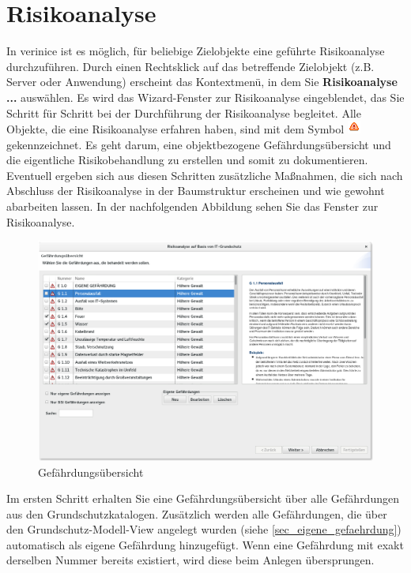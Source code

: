 \documentclass[a4paper,10pt]{book}
\begin{document}
\section{Risikoanalyse} \label{Risikoanalyse}
In verinice ist es möglich, für beliebige Zielobjekte eine geführte Risikoanalyse durchzuführen. Durch einen Rechtsklick auf das betreffende Zielobjekt (z.B. Server oder Anwendung) erscheint das Kontextmenü, in dem Sie \textbf{Risikoanalyse ...} auswählen. Es wird das Wizard-Fenster zur Risikoanalyse eingeblendet, das Sie Schritt für Schritt bei der Durchführung der Risikoanalyse begleitet. Alle Objekte, die eine Risikoanalyse erfahren haben, sind mit dem Symbol \includegraphics[height=2ex]{Icon/Risikoanalyse.png} gekennzeichnet. Es geht darum, eine objektbezogene Gefährdungsübersicht und die eigentliche Risikobehandlung zu erstellen und somit zu dokumentieren. Eventuell ergeben sich aus diesen Schritten zusätzliche Maßnahmen, die sich nach Abschluss der Risikoanalyse in der Baumstruktur erscheinen und wie gewohnt abarbeiten lassen. In der nachfolgenden Abbildung sehen Sie das Fenster zur Risikoanalyse.
\newline
\begin{figure}[H]
  \centering
  \includegraphics[width=\textwidth]{Screenshot/gefaehrdungsuebersicht.png}
  \caption{\label{Gefaehrdungsuebersicht} Gefährdungsübersicht}
\end{figure}
Im ersten Schritt erhalten Sie eine Gefährdungsübersicht über alle Gefährdungen aus den Grundschutzkatalogen. Zusätzlich werden alle Gefährdungen, die über den Grundschutz-Modell-View angelegt wurden (siehe \ref{sec_eigene_gefaehrdung}) automatisch als eigene Gefährdung hinzugefügt. Wenn eine Gefährdung mit exakt derselben Nummer bereits existiert, wird diese beim Anlegen übersprungen.\\
\end{document}
